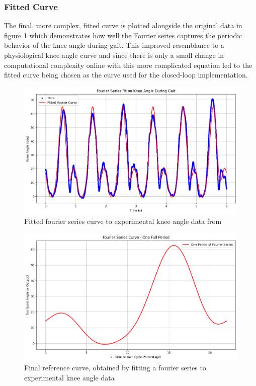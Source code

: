 \subsubsection{Fitted Curve}
The final, more complex, fitted curve is plotted alongside the original data in figure \ref{fig:kneeangleref} which demonstrates how well the Fourier series captures the periodic behavior of the knee angle during gait. This improved resemblance to a physiological knee angle curve and since there is only a small change in computational complexity online with this more complicated equation led to the fitted curve being chosen as the curve used for the closed-loop implementation.
\begin{figure} [h]
    \centering
    \includegraphics[width=0.99\linewidth]{images/goodkneeangleref.png}
    \caption{Fitted fourier series curve to experimental knee angle data from \cite{camargo_comprehensive_2021}}
    \label{fig:kneeangleref}
\end{figure}
\begin{figure} [h]
    \centering
    \includegraphics[width=0.85\linewidth]{images/fittedKneeAngleRef.png}
    \caption{Final reference curve, obtained by fitting a fourier series to experimental knee angle data}
    \label{fig:enter-label}
\end{figure}


